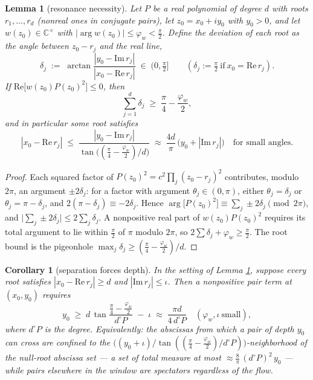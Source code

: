 \documentclass[11pt]{article}
\theoremstyle{plain}
\newtheorem{lemma}[theorem]{Lemma}
\newtheorem{corollary}[theorem]{Corollary}
\theoremstyle{definition}
\theoremstyle{remark}
\newcommand{\C}{\mathbb{C}}
\begin{document}
\begin{lemma}[resonance necessity]\label{lem:resonance}
Let $P$ be a real polynomial of degree $d$ with roots $r_1,\dots,r_d$ (nonreal ones in
conjugate pairs), let $z_0=x_0+iy_0$ with $y_0>0$, and let $w(z_0)\in\C^{\times}$ with
$|\arg w(z_0)|\le\varphi_w<\tfrac\pi2$. Define the deviation of each root as the angle
between $z_0-r_j$ and the real line,
\[
  \delta_j \;:=\; \arctan\!\frac{|y_0-\mathrm{Im}\,r_j|}{|x_0-\mathrm{Re}\,r_j|}
  \;\in\;(0,\tfrac\pi2]
  \qquad(\delta_j:=\tfrac\pi2\ \text{if}\ x_0=\mathrm{Re}\,r_j).
\]
If $\mathrm{Re}\bigl[w(z_0)P(z_0)^2\bigr]\le0$, then
\[
  \sum_{j=1}^{d}\delta_j\;\ge\;\frac\pi4-\frac{\varphi_w}2,
\]
and in particular some root satisfies
\[
  |x_0-\mathrm{Re}\,r_j|\;\le\;
  \frac{|y_0-\mathrm{Im}\,r_j|}{\tan\bigl((\tfrac\pi4-\tfrac{\varphi_w}2)/d\bigr)}
  \;\approx\;\frac{4d}{\pi}\,\bigl(y_0+|\mathrm{Im}\,r_j|\bigr)
  \quad\text{for small angles.}
\]
\end{lemma}

\begin{proof}
Each squared factor of $P(z_0)^2=c^2\prod_j(z_0-r_j)^2$ contributes, modulo $2\pi$, an
argument $\pm2\delta_j$: for a factor with argument $\theta_j\in(0,\pi)$, either
$\theta_j=\delta_j$ or $\theta_j=\pi-\delta_j$, and $2(\pi-\delta_j)\equiv-2\delta_j$.
Hence $\arg\bigl[P(z_0)^2\bigr]\equiv\sum_j\pm2\delta_j \pmod{2\pi}$, and
$\bigl|\sum_j\pm2\delta_j\bigr|\le2\sum_j\delta_j$. A nonpositive real part of
$w(z_0)P(z_0)^2$ requires its total argument to lie within $\tfrac\pi2$ of $\pi$
modulo $2\pi$, so $2\sum\delta_j+\varphi_w\ge\tfrac\pi2$. The root bound is the
pigeonhole $\max_j\delta_j\ge(\tfrac\pi4-\tfrac{\varphi_w}2)/d$.
\end{proof}

\begin{corollary}[separation forces depth]\label{cor:separation}
In the setting of Lemma \ref{lem:resonance}, suppose every root satisfies
$|x_0-\mathrm{Re}\,r_j|\ge d$ and $|\mathrm{Im}\,r_j|\le\iota$. Then a nonpositive
pair term at $(x_0,y_0)$ requires
\[
  y_0\;\ge\;d\,\tan\!\frac{\tfrac\pi4-\tfrac{\varphi_w}2}{\,d^{\circ}\!P\,}\;-\;\iota
  \;\approx\;\frac{\pi d}{4\,d^{\circ}\!P}\quad(\varphi_w,\iota\ \text{small}),
\]
where $d^{\circ}\!P$ is the degree. Equivalently: the abscissas from which a pair of
depth $y_0$ can cross are confined to the
$\bigl((y_0+\iota)/\tan((\tfrac\pi4-\tfrac{\varphi_w}2)/d^{\circ}\!P)\bigr)$-neighborhood
of the null-root abscissa set --- a set of total measure at most
$\approx\tfrac{8}{\pi}\,(d^{\circ}\!P)^2\,y_0$ --- while pairs elsewhere in the window
are spectators regardless of the flow.
\end{corollary}
\end{document}
